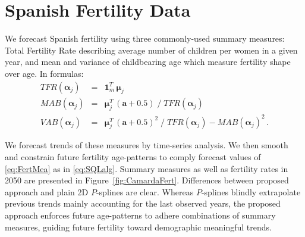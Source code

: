 \documentclass[a4paper,twoside, openright, 12pt, leqno]{article}
\begin{document}
\section{Spanish Fertility Data}

We forecast Spanish fertility using three commonly-used summary measures: Total Fertility Rate describing average number of children per women in a given year, and mean and variance of childbearing age which measure fertility shape over age. In formulas:
\begin{eqnarray}\label{eq:FertMea}
TFR(\bm{\alpha}_{j}) &=& \bm{1}_{m}^{T} \, \bm{\mu}_{j}\\
MAB(\bm{\alpha}_{j}) &=& \bm{\mu}_{j}^{T} \, (\bm{a}+0.5) \; / \; TFR(\bm{\alpha}_{j})\nonumber\\
VAB(\bm{\alpha}_{j}) &=& \bm{\mu}_{j}^{T} \, (\bm{a}+0.5)^2 \; / \; TFR(\bm{\alpha}_{j}) - MAB(\bm{\alpha}_{j})^2\nonumber \, .
\end{eqnarray} 

We forecast trends of these measures by time-series analysis. We then smooth and constrain future fertility age-patterns to comply forecast values of \eqref{eq:FertMea} as in \eqref{eq:SQLalg}. Summary measures as well as fertility rates in 2050 are presented in Figure~\ref{fig:CamardaFert}. Differences between proposed approach and plain 2D $P$-splines are clear. Whereas $P$-splines blindly extrapolate previous trends mainly accounting for the last observed years, the proposed approach enforces future age-patterns to adhere combinations of summary measures, guiding future fertility toward demographic meaningful trends. 
\end{document}
